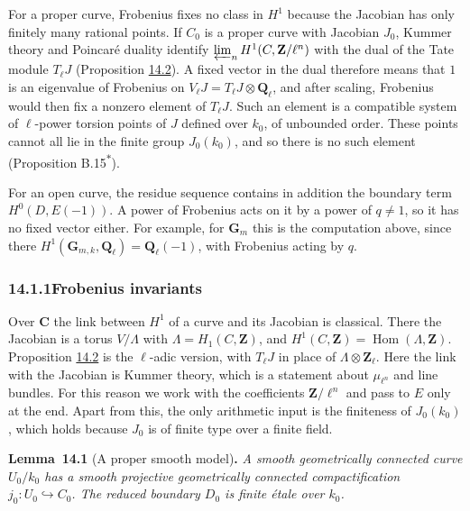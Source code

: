 \documentclass[11pt]{article}
\newenvironment{bpstatement}[2]{\par\addvspace{0.6\baselineskip}\noindent\textbf{#1}#2\textbf{.}\enspace\ignorespaces}
  {\par\addvspace{0.4\baselineskip}}
\newenvironment{bpstatementit}[2]{\begin{bpstatement}{#1}{#2}\itshape\ignorespaces}{\end{bpstatement}}
\newcommand{\bpout}[1]{#1\textsuperscript{\hyperlink{bp-outside}{\ensuremath{\ast}}}}
\providecommand{\Hom}{}\renewcommand{\Hom}{\operatorname{Hom}}
\begin{document}
For a proper curve, Frobenius fixes no class in \(H^1\) because the Jacobian has only finitely many rational points. If \(C_0\) is a proper curve with Jacobian \(J_0\), Kummer theory and Poincaré duality identify \(\varprojlim_nH^1(C,\mathbf Z/\ell^n)\) with the dual of the Tate module \(T_\ell J\) (Proposition \hyperref[bp48]{14.2}). A fixed vector in the dual therefore means that \(1\) is an eigenvalue of Frobenius on \(V_\ell J=T_\ell J\otimes\mathbf Q_\ell\), and after scaling, Frobenius would then fix a nonzero element of \(T_\ell J\). Such an element is a compatible system of \(\ell\)-power torsion points of \(J\) defined over \(k_0\), of unbounded order. These points cannot all lie in the finite group \(J_0(k_0)\), and so there is no such element (Proposition \bpout{B.15}).

For an open curve, the residue sequence contains in addition the boundary term \(H^0(D,E(-1))\). A power of Frobenius acts on it by a power of \(q\ne1\), so it has no fixed vector either. For example, for \(\mathbf G_m\) this is the computation above, since there \(H^1(\mathbf G_{m,k},\mathbf Q_\ell)=\mathbf Q_\ell(-1)\), with Frobenius acting by \(q\).

\subsubsection*{\texorpdfstring{14.1.1\quad Frobenius invariants}{14.1.1 Frobenius invariants}}
\label{bp43}%
\label{bp44}%
Over \(\mathbf C\) the link between \(H^1\) of a curve and its Jacobian is classical. There the Jacobian is a torus \(V/\Lambda\) with \(\Lambda=H_1(C,\mathbf Z)\), and \(H^1(C,\mathbf Z)=\Hom(\Lambda,\mathbf Z)\). Proposition \hyperref[bp48]{14.2} is the \(\ell\)-adic version, with \(T_\ell J\) in place of \(\Lambda\otimes\mathbf Z_\ell\). Here the link with the Jacobian is Kummer theory, which is a statement about \(\mu_{\ell^n}\) and line bundles. For this reason we work with the coefficients \(\mathbf Z/\ell^n\) and pass to \(E\) only at the end. Apart from this, the only arithmetic input is the finiteness of \(J_0(k_0)\), which holds because \(J_0\) is of finite type over a finite field.

\label{bp45}%
\begin{bpstatementit}{Lemma~14.1}{ (A proper smooth model)}
A smooth geometrically connected curve \(U_0/k_0\) has a smooth projective geometrically connected compactification \(j_0:U_0\hookrightarrow C_0\). The reduced boundary \(D_0\) is finite étale over \(k_0\).
\end{bpstatementit}
\end{document}

